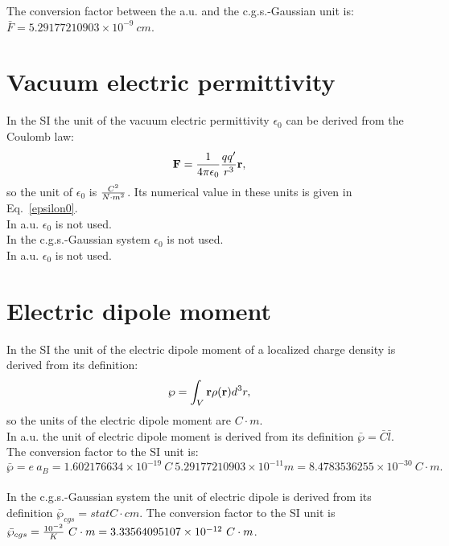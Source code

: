 \documentclass[12pt,a4paper]{article}
\def\e{1.602176634\times 10^{-19}}
\def\abohr{5.29177210903\times 10^{-11}}
\def\bardip{8.4783536255\times 10^{-30}}
\def\diptodip{3.33564095107\times 10^{-12}}
\def\barcapcgs{5.29177210903\times 10^{-9}}
\begin{document}
{\color{green} 
The conversion factor between the a.u. and the c.g.s.-Gaussian unit is: 
$\bar F = \barcapcgs \ cm$.
}


\newpage
\section{\color{coral}Vacuum electric permittivity}
In the SI the unit of the vacuum electric permittivity $\epsilon_0$
can be derived from the Coulomb law:
\begin{equation}
{\bf F} = {1\over 4 \pi \epsilon_0} {qq'\over r^3} {\bf r},
\end{equation}
so the unit of $\epsilon_0$ is $C^2 \over N\cdot m^2$. Its numerical
value in these units is given in Eq.~\ref{epsilon0}.
\\

{\color{web-blue} In a.u. $\epsilon_0$ is not used.} 
\\

{\color{orange} In the c.g.s.-Gaussian system $\epsilon_0$ is not used.
}
\\

{\color{green} In a.u. $\epsilon_0$ is not used. 
\\
}

\newpage
\section{\color{coral}Electric dipole moment}
In the SI the unit of the electric dipole moment of a localized
charge density is derived from its definition:
\begin{equation}
{\bf \wp}=\int_V {\bf r} \rho({\bf r}) d^3r,
\end{equation}
so the units of the electric dipole moment are $C\cdot m$.
\\

{\color{web-blue} In a.u. the unit of electric dipole moment is derived
from its definition $\bar \wp=\bar C \bar l$. The conversion factor to the
SI unit is:
\begin{equation}
\bar \wp = e\ a_B = \e\ C\ \abohr m = \bardip\ C\cdot m.
\end{equation}
} 
\\

{\color{orange} In the c.g.s.-Gaussian system the unit of electric 
dipole is derived from its definition $\bar \wp_{cgs}=statC\cdot cm$.
The conversion factor to the SI unit is $\bar \wp_{cgs}={10^{-2} \over K}
\ C\cdot m=\diptodip\ C\cdot m$.
}
\\
\end{document}
